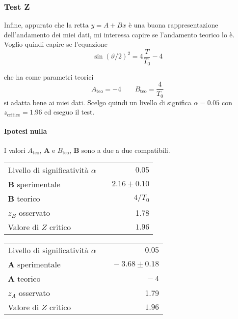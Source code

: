 \documentclass{article}
\begin{document}
	\subsubsection{Test Z}
	Infine, appurato che la retta $y = A + Bx$ è una buona rappresentazione dell'andamento dei miei dati, mi interessa capire se l'andamento teorico lo è. Voglio quindi capire se l'equazione 
	\[
	\sin{\left(\vartheta/2\right)}^2 = 4\frac{T}{T_0} - 4
	\]
	
	che ha come parametri teorici
	\[
	A_\text{teo} = -4 \qquad B_\text{teo} =  \frac{4}{T_0}
	\]
	si adatta bene ai miei dati. Scelgo quindi un livello di significa $\alpha = 0.05$ con $z_{\text{critico}} = 1.96$ ed eseguo il test.
	
	\paragraph{Ipotesi nulla} I valori $A_{\text{teo}}$, $\mathbf{A}$ e  $B_{\text{teo}}$, $\mathbf{B}$ sono a due a due compatibili.
	
	\vspace{0.7cm}
	\begin{minipage}{0.5\textwidth}
		\begin{table}[H]
			\centering
			\begin{tabular}{lr} 
				Livello di significatività $\alpha$		&$\quad 0.05$  \\
				\textbf{B} sperimentale				& $\quad2.16 \pm  0.10$\\
				\textbf{B} teorico					& $\quad4/T_0$ \\
				$z_{B}$ osservato 					& $\quad$1.78 \\
				Valore di $Z$ critico     	& $\quad 1.96$
			\end{tabular}
		\end{table}
	\end{minipage}
	\begin{minipage}{0.5\textwidth}
		\begin{table}[H]
			\centering
			\begin{tabular}{lr} 
				Livello di significatività $\alpha$		&$\quad 0.05$  \\
				\textbf{A} sperimentale             	& $\quad-3.68 \pm 0.18 $     \\
				\textbf{A} teorico					&  $\quad-4$\\
				$z_{A}$ osservato					& 1.79 \\ 
				Valore di $Z$ critico     	& $\quad 1.96$
			\end{tabular}
		\end{table}
	\end{minipage}
	\vspace{0.7cm}
	
\end{document}
